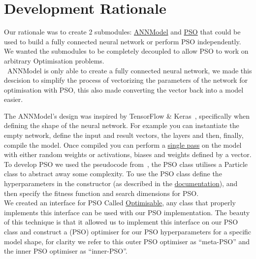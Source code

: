 \documentclass[12pt]{article}
\begin{document}
\section{Development Rationale}
Our rationale was to create 2 submodules: \href{https://www2.macs.hw.ac.uk/~sf52/Bio-Comp-docs/html/Coursework.ANNModel.html}{ANNModel} and \href{https://www2.macs.hw.ac.uk/~sf52/Bio-Comp-docs/html/Coursework.PSO.html}{PSO} that could be used to build a fully connected neural network or perform PSO independently.
We wanted the submodules to be completely decoupled to allow PSO to work on arbitrary Optimisation problems.\\

\noindent~ANNModel is only able to create a fully connected neural network, we made this descision to simplify the process of vectorizing the parameters of the network for optimisation with PSO, this also made converting the vector back into a model easier.

The ANNModel’s design was inspired by TensorFlow \& Keras~\autocite{kerasKerasDocumentationModel,tensorflowModuleTfKeras}, specifically when defining the shape of the neural network. For example you can instantiate the empty network, define the input and result vectors, the layers and then, finally, compile the model.
Once compiled you can perform a \href{https://www2.macs.hw.ac.uk/~sf52/Bio-Comp-docs/html/Coursework.ANNModel.html?highlight=one_pass#Coursework.ANNModel.model.ANN.one_pass}{single pass} on the model with either random weights or activations, biases and weights defined by a vector.\\

\noindent To develop PSO we used the pseudocode from~\autocite{lukeEssentialsMetaheuristicsSet2013}, the PSO class utilises a Particle class to abstract away some complexity.
To use the PSO class define the hyperparameters in the constructor (as described in the \href{https://www2.macs.hw.ac.uk/~sf52/Bio-Comp-docs/html/Coursework.PSO.html?highlight=pso#Coursework.PSO.pswarm.PSO}{documentation}), and then specify the fitness function and search dimensions for PSO. \\

\noindent We created an interface for PSO Called \href{https://www2.macs.hw.ac.uk/~sf52/Bio-Comp-docs/html/Coursework.PSO.html?highlight=optimisable#Coursework.PSO.interface.Optimisable}{Optimisable}, any class that properly implements this interface can be used with our PSO implementation. 
The beauty of this technique is that it allowed us to implement this interface on our PSO class and construct a (PSO) optimiser for our PSO hyperparameters for a specific model shape, for clarity we refer to this outer PSO optimiser as ``meta-PSO'' and the inner PSO optimiser as ``inner-PSO''.
\end{document}
